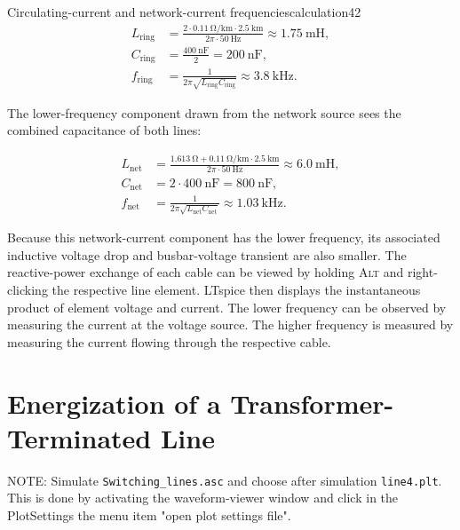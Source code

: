 \begin{calculation}{Circulating-current and network-current frequencies}{calculation42}
\begin{align}
L_{\mathrm{ring}}
 &=\frac{2\cdot\SI{0.11}{\ohm\per\kilo\metre}
              \cdot\SI{2.5}{\kilo\metre}}
             {2\pi\cdot\SI{50}{\hertz}}
   \approx\SI{1.75}{\milli\henry},\\
C_{\mathrm{ring}}
 &=\frac{\SI{400}{\nano\farad}}{2}
   =\SI{200}{\nano\farad},\\
f_{\mathrm{ring}}
 &=\frac{1}{2\pi\sqrt{L_{\mathrm{ring}}C_{\mathrm{ring}}}}
   \approx\boxed{\SI{3.8}{\kilo\hertz}}.
\end{align}

The lower-frequency component drawn from the network source sees the combined
capacitance of both lines:

\begin{align}
L_{\mathrm{net}}
 &=\frac{\SI{1.613}{\ohm}
           +\SI{0.11}{\ohm\per\kilo\metre}\cdot\SI{2.5}{\kilo\metre}}
          {2\pi\cdot\SI{50}{\hertz}}
   \approx\SI{6.0}{\milli\henry},\\
C_{\mathrm{net}}&=2\cdot\SI{400}{\nano\farad}
   =\SI{800}{\nano\farad},\\
f_{\mathrm{net}}
 &=\frac{1}{2\pi\sqrt{L_{\mathrm{net}}C_{\mathrm{net}}}}
   \approx\boxed{\SI{1.03}{\kilo\hertz}}.
\end{align}
\end{calculation}

Because this network-current component has the lower frequency, its associated
inductive voltage drop and busbar-voltage transient are also smaller. The
reactive-power exchange of each cable can be viewed by holding \textsc{Alt}
and right-clicking the respective line element. LTspice then displays the
instantaneous product of element voltage and current.
The lower frequency can be observed by measuring the current at the voltage source. The higher frequency is measured by measuring the current flowing through the respective cable.

\section{Energization of a Transformer-Terminated Line}
\label{sec:section46}
NOTE: Simulate \texttt{Switching\_lines.asc} and choose after simulation \texttt{line4.plt}.
This is done by activating the waveform-viewer window and click in the PlotSettings the menu item "open plot settings file".
  
